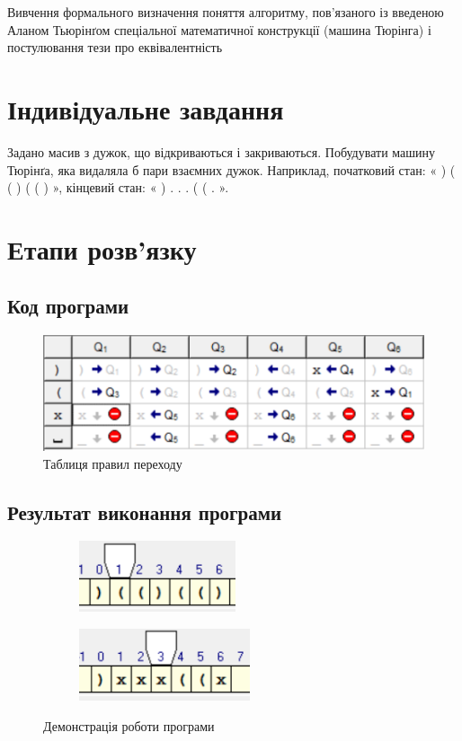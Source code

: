 \documentclass[a4paper, 12pt, oneside]{extarticle}
\begin{document}
\Margins



Вивчення формального визначення поняття алгоритму,
пов’язаного із введеною Аланом Тьюрінґом спеціальної математичної
конструкції (машина Тюрінга) і постулювання тези про еквівалентність

\section*{Індивідуальне завдання}

Задано масив з дужок, що відкриваються і закриваються. Побудувати
машину Тюрінґа, яка видаляла б пари взаємних дужок. Наприклад,
початковий стан: « ) ( ( ) ( ( ) », кінцевий стан: « ) . . . ( ( . ».

\section*{Етапи розв'язку}

\subsection*{Код програми}

\begin{figure}[h]
	\centering
	\includegraphics[width=.5\textwidth]{commands.png}
	\caption{Таблиця правил переходу}
\end{figure}

\subsection*{Результат виконання програми}

\begin{figure}[h]
	\begin{subfigure}{.5\textwidth}
		\centering
		\includegraphics[width=.5\textwidth]{in.png}
	\end{subfigure}
	\hfill
	\begin{subfigure}{.5\textwidth}
		\centering
		\includegraphics[width=.55\textwidth]{out.png}
	\end{subfigure}
	\caption{Демонстрація роботи програми}
\end{figure}
\end{document}
